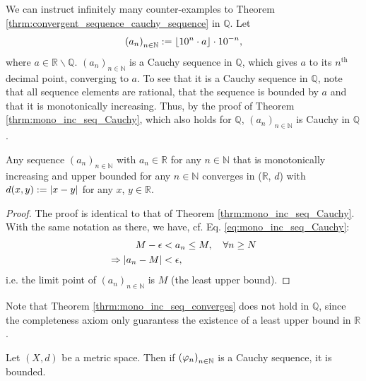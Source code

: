 \begin{exmp}
	We can instruct infinitely many counter-examples to Theorem \ref{thrm:convergent_sequence_cauchy_sequence} in $\mathbb Q$. Let 
	\begin{align}
		\left(a_n\right)_{n\in\mathbb N} := \floor{10^{n} \cdot a}\cdot 10^{-n}, 
	\end{align}
	where $a\in \mathbb R\backslash \mathbb Q$. $(a_n)_{n\in\mathbb N}$ is a Cauchy sequence in $\mathbb Q$, which gives $a$ to its $n^{\text{th}}$ decimal point, converging to $a$. To see that it is a Cauchy sequence in $\mathbb Q$, note that all sequence elements are rational, that the sequence is bounded by $a$ and that it is monotonically increasing. Thus, by the proof of Theorem \ref{thrm:mono_inc_seq_Cauchy}, which also holds for $\mathbb Q$, $\left(a_n\right)_{n\in\mathbb N}$ is Cauchy in $\mathbb Q$.
\end{exmp}

\begin{theorem}\label{thrm:mono_inc_seq_converges}
	Any sequence $(a_n)_{n\in\mathbb N}$ with $a_n\in \mathbb R$ for any $n\in \mathbb N$ that is monotonically increasing and upper bounded for any $n\in\mathbb N$ converges in ($\mathbb R$, $d$) with $d(x, y):= \abs{x - y}$ for any $x$, $y\in \mathbb R$.
\end{theorem}

\begin{proof}
	The proof is identical to that of Theorem \ref{thrm:mono_inc_seq_Cauchy}. With the same notation as there, we have, cf. Eq. \eqref{eq:mono_inc_seq_Cauchy}:
	\begin{align}
		M - \epsilon &< a_n \leq M, \quad \forall n\geq N
		\\ \Rightarrow \abs{a_n - M} &< \epsilon,
	\end{align}
	i.e. the limit point of $(a_n)_{n\in\mathbb N}$ is $M$ (the least upper bound).
\end{proof}

\begin{remark}
	Note that Theorem \ref{thrm:mono_inc_seq_converges} does not hold in $\mathbb Q$, since the completeness axiom only guarantess the existence of a least upper bound in $\mathbb R$.
\end{remark}

\begin{theorem}\label{thrm:cauchy_sequences_bounded}
	Let $(X, d)$ be a metric space. Then if $\seq[\varphi_n]$ is a Cauchy sequence, it is bounded.
\end{theorem}

